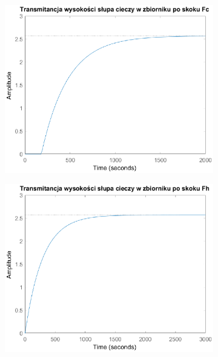 \begin{figure}[h!]
   \centering
   \begin{subfigure}[b]{0.6\textwidth}
      \includegraphics[width=1\linewidth]{img/transforms/transformHFc.eps}
      \caption{}
      \label{fig:fig:transformH1}
   \end{subfigure}
       
   \begin{subfigure}[b]{0.6\textwidth}
      \includegraphics[width=1\linewidth]{img/transforms/transformHFh.eps}
      \caption{}
      \label{fig:fig:transformH2}
   \end{subfigure}
       

\end{figure}

